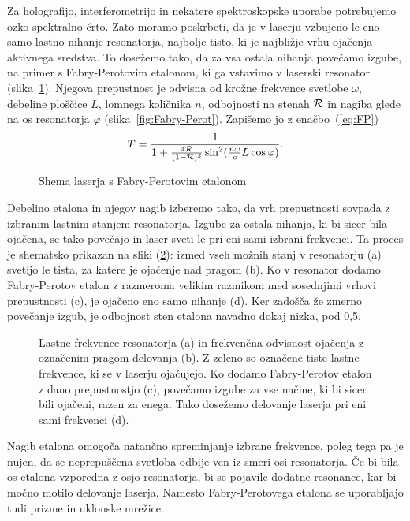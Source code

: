 Za holografijo, interferometrijo in nekatere spektroskopske uporabe
potrebujemo ozko spektralno črto. Zato moramo poskrbeti, da je v laserju vzbujeno le
eno samo lastno nihanje resonatorja, najbolje tisto, ki je najbližje vrhu ojačenja
aktivnega sredstva. To dosežemo tako, da za vsa ostala nihanja povečamo izgube,
na primer s Fabry-Perotovim etalonom, 
ki ga vstavimo v laserski resonator
(slika~\ref{fig:FPres}). Njegova prepustnost je odvisna od krožne frekvence 
svetlobe $\omega$, debeline ploščice $L$, lomnega količnika $n$, odbojnosti na stenah 
${\cal R}$ in nagiba glede na os resonatorja $\varphi$ (slika~\ref{fig:Fabry-Perot}).
Zapišemo jo z enačbo~(\ref{eq:FP}) 
\begin{equation}
T=\frac{1}{1+\frac{4{\cal {R}}}{(1-{\cal {R}})^{2}}\sin^{2}(\frac{n\omega}{c}L\cos \varphi )}.
\label{5.22}
\end{equation}

\begin{figure}[h]
\centering
\def\svgwidth{90truemm} 

\caption{Shema laserja s Fabry-Perotovim etalonom}
\label{fig:FPres}
\end{figure}
Debelino etalona in njegov nagib 
izberemo tako, da vrh prepustnosti sovpada z izbranim lastnim stanjem resonatorja. 
Izgube za ostala nihanja, ki bi sicer bila ojačena, se tako povečajo in laser
sveti le pri eni sami izbrani frekvenci. Ta proces je shematsko prikazan na sliki 
(\ref{fig:FPmodes}): izmed vseh možnih stanj v resonatorju (a) svetijo le tista, za katere
je ojačenje nad pragom (b). Ko v resonator dodamo Fabry-Perotov etalon z razmeroma velikim
razmikom med sosednjimi vrhovi prepustnosti (c), je ojačeno eno samo nihanje (d). 
Ker zadošča že zmerno povečanje izgub, je odbojnost sten etalona navadno dokaj nizka, 
pod 0,5. 

\begin{figure}[h]
\centering
\def\svgwidth{110truemm} 

\caption{Lastne frekvence resonatorja (a) in frekvenčna odvisnost ojačenja z označenim 
pragom delovanja (b). Z zeleno so označene tiste lastne frekvence, ki se v laserju ojačujejo. 
Ko dodamo Fabry-Perotov etalon z dano prepustnostjo (c), povečamo
izgube za vse načine, ki bi sicer bili ojačeni, razen za enega. 
Tako dosežemo delovanje laserja pri eni sami frekvenci (d).}
\label{fig:FPmodes}
\end{figure}

\begin{remark}
Nagib etalona omogoča natančno spreminjanje izbrane frekvence, poleg tega
pa je nujen, da se neprepuščena svetloba odbije ven iz smeri osi resonatorja. Če bi 
bila os etalona vzporedna z osjo resonatorja, bi se pojavile dodatne resonance, 
kar bi močno motilo delovanje laserja. Namesto Fabry-Perotovega etalona se uporabljajo
tudi prizme in uklonske mrežice.
\end{remark}

